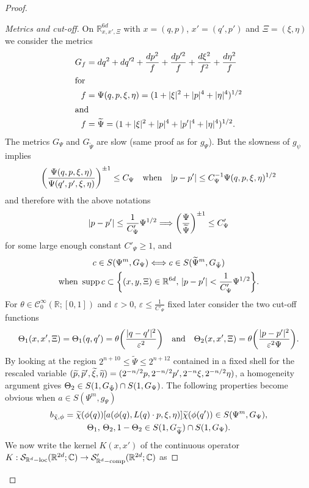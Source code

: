 \documentclass[AHL,Unicode,longabstracts]{cedram}
\newcommand{\C}{\mathbb{C}}
\newcommand{\R}{\mathbb{R}}
\newcommand{\clC}{\mathcal{C}}
\newcommand{\clS}{\mathcal{S}}
\DeclareMathOperator{\ccomp}{comp}
\DeclareMathOperator{\suppp}{supp}
\DeclareMathOperator{\locc}{loc}
\let\oldtilde\tilde
\renewcommand*{\tilde}[1]{\mathchoice{\widetilde{#1}}{\widetilde{#1}}{\oldtilde{#1}}{\oldtilde{#1}}}
\let\originalleft\left
\let\originalright\right
\renewcommand{\left}{\mathopen{}\mathclose\bgroup\originalleft}
\renewcommand{\right}{\aftergroup\egroup\originalright}
\renewcommand*{\to}{\mathchoice{\longrightarrow}{\rightarrow}{\rightarrow}{\rightarrow}}
\renewcommand*{\implies}{\mathchoice{\Longrightarrow}{\Rightarrow}{\Rightarrow}{\Rightarrow}}
\begin{document}
\begin{proof}
\begin{proof}[{Metrics and cut-off}]
On $\R_{x,x',\Xi}^{6d}$ with $x=(q,p)$, $x'=(q',p')$ and $\Xi=(\xi,\eta)$ we consider the metrics
\begin{align*}
G_{f} &=dq^{2}+dq'^{2}+\frac{dp^{2}}{f}+\frac{dp'^{2}}{f}+\frac{d\xi^{2}}{f^{2}}+\frac{d\eta^{2}}{f}\\
\intertext{for}
f &=\Psi(q,p,\xi,\eta)=(1+|\xi|^{2}+|p|^{4}+|\eta|^{4})^{1/2}\\
\intertext{and} 
f &=\widetilde{\Psi}=(1+|\xi|^{2}+|p|^{4}+|p'|^{4}+|\eta|^{4})^{1/2}.
\end{align*}
The metrics $G_{\Psi}$ and $G_{\widetilde{\Psi}}$ are slow (same proof as for $g_{\Psi}$). But the slowness of $g_{\psi}$ implies
\[
\left(\frac{\Psi(q,p,\xi,\eta)}{\Psi(q',p',\xi,\eta)}\right)^{\pm 1}\leq C_{\Psi}\quad\text{when}\quad |p-p'|\leq C_{\Psi}^{-1}\Psi(q,p,\xi,\eta)^{1/2}
\]
and therefore with the above notations
\[
|p-p'|\leq \frac{1}{C'_{\Psi}}\Psi^{1/2}\implies \left(\frac{\Psi}{\tilde{\Psi}}\right)^{\pm 1}\leq C'_{\Psi}
\]
for some large enough constant $C'_{\Psi}\geq 1$, and
\begin{multline*}
c\in S(\Psi^{m},G_{\Psi})\Longleftrightarrow c\in S(\widetilde{\Psi}^{m},G_{\tilde{\Psi}})\\
\text{when }\suppp c\subset
\left\{(x,y,\Xi)\in \R^{6d},\, |p-p'|< \frac{1}{C'_{\Psi}}\Psi^{1/2}\right\}.
\end{multline*}
For $\theta\in \clC^{\infty}_{0}(\R;[0,1])$ and $\varepsilon>0$, $\varepsilon\leq \frac{1}{C'_{\Psi}}$ fixed later consider the two cut-off functions
\[
\Theta_{1}(x,x',\Xi)=\Theta_1(q,q')=\theta\left(\frac{|q-q'|^{2}}{\varepsilon^{2}}\right)\quad\text{and}\quad \Theta_{2}(x,x',\Xi)=\theta\left(\frac{|p-p'|^{2}}{\varepsilon^{2}\Psi}\right).
\]
By looking at the region $2^{n+10}\leq \widetilde{\Psi}\leq 2^{n+12}$ contained in a fixed shell for the rescaled variable $(\tilde{p},\tilde{p}',\tilde{\xi},\tilde{\eta})=(2^{-n/2}p,2^{-n/2}p',2^{-n}\xi,2^{-n/2}\eta)$, a homogeneity argument gives $\Theta_{2}\in S(1,G_{\tilde{\Psi}})\cap S(1,G_{\Psi})$. The following properties become obvious when $a\in S(\Psi^{m},g_{\Psi})$
\begin{multline*}
 b_{\tilde\chi,\phi}=\tilde\chi(\phi(q))
[a(\phi(q),L(q)\cdot p,\xi,\eta)]\tilde\chi(\phi(q'))\in S(\Psi^{m},G_{\Psi}),\\
 \Theta_{1},\,\Theta_{2}, 1-\Theta_{2}\in S(1,G_{\widetilde{\Psi}})\cap S(1,G_{\Psi}).
\end{multline*}
We now write the kernel $K(x,x')$ of the continuous operator $K:\clS_{\R^{d}-\locc}(\R^{2d};\C)\to \clS'_{\R^{d}-\ccomp}(\R^{2d};\C)$ as

\end{proof}
\end{proof}
\end{document}
